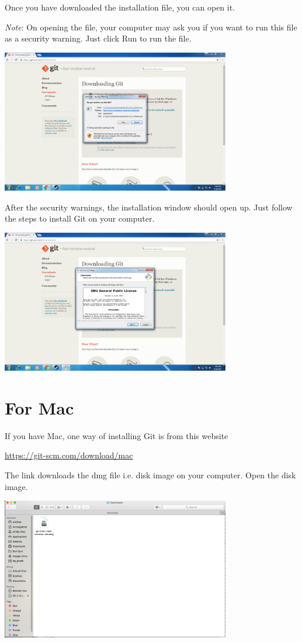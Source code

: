 \documentclass[12pt]{report}
\begin{document}
\noindent
Once you have downloaded the installation file, you can open it. 

\textit{Note}: On opening the file, your computer may ask you if you want to run this file as a security warning. Just click Run to run the file.

\includegraphics[width=0.75\textwidth]{security.png}

After the security warnings, the installation window should open up. Just follow the steps to install Git on your computer.

\includegraphics[width=0.75\textwidth]{windows-install.png}

\section{For Mac}

If you have Mac, one way of installing Git is from this website

\url{https://git-scm.com/download/mac}

The link downloads the dmg file i.e. disk image on your computer. Open the disk image.

\includegraphics[width=0.75\textwidth]{git-mac-disk.png}
\end{document}
